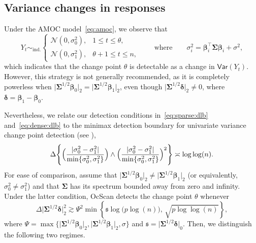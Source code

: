 \documentclass[11pt, a4paper]{article}
\newcommand{\mc}{\mathcal}
\renewcommand{\l}{\left}
\renewcommand{\r}{\right}
\newcommand{\cp}{\theta}
\newcommand{\Var}[0]{\mathsf{Var}}
\theoremstyle{definition}
\theoremstyle{definition}
\theoremstyle{definition}
\theoremstyle{definition}
\theoremstyle{definition}
\theoremstyle{remark}
\theoremstyle{definition}
\theoremstyle{definition}
\theoremstyle{definition}
\begin{document}
\subsection{Variance changes in responses}\label{ss:var}
Under the AMOC model~\eqref{eq:amoc}, we observe that
\[
Y_t \sim_{\mathrm{ind.}}
\begin{cases}
\mc N(0, \sigma_0^2), & 1 \le t \le \cp, \\
\mc N(0, \sigma_1^2), & \cp + 1 \le t \le n,
\end{cases}
\qquad \text{where} \qquad
\sigma_i^2 = \bm\beta_i^\top \bm\Sigma \bm\beta_i + \sigma^2,
\]
which indicates that the change point $\cp$ is detectable as a change in $\Var(Y_t)$. However, this strategy is not generally recommended, as it is completely powerless when
$\lvert \bm\Sigma^{1/2}\bm\beta_0\rvert_2 = \lvert \bm\Sigma^{1/2}\bm\beta_1\rvert_2$,
even though $\lvert \bm\Sigma^{1/2}\bm\delta\rvert_2 \neq 0$, where $\bm\delta = \bm\beta_1 - \bm\beta_0$.

Nevertheless, we relate our detection conditions in~\eqref{eq:sparse:dlb} and~\eqref{eq:dense:dlb} to the  minimax detection boundary for univariate variance change point detection (see \citealp[Theorem~1]{moen2024minimax}),
\begin{equation}\label{e:var:bnd}
\Delta \Biggl\{
\Bigl(\frac{\lvert \sigma_0^2 - \sigma_1^2\rvert}{\min\{\sigma_0^2, \sigma_1^2\}}\Bigr)
\wedge
\Bigl(\frac{\lvert \sigma_0^2 - \sigma_1^2\rvert}{\min\{\sigma_0^2, \sigma_1^2\}}\Bigr)^2
\Biggr\}
\asymp \log\log(n).
\end{equation}
For ease of comparison, assume that
$\lvert \bm\Sigma^{1/2}\bm\beta_0\rvert_2 \neq \lvert \bm\Sigma^{1/2}\bm\beta_1\rvert_2$
(or equivalently, $\sigma_0^2 \neq \sigma_1^2$) and that $\bm\Sigma$ has its spectrum bounded away from zero and infinity. Under the latter condition, OcScan detects the change point $\theta$ whenever
\begin{equation}\label{e:simple}
\Delta\lvert\bm\Sigma^{1/2}\bm\delta\rvert_2^2 \gtrsim \Psi^2\min\l\{\mathfrak{s}\log\bigl(p\log(n)\bigr),\,\sqrt{p \log\log(n)}\r\},
\end{equation}
where $\Psi = \max\{
\lvert \bm\Sigma^{1/2}\bm\beta_0\rvert_2,
\lvert \bm\Sigma^{1/2}\bm\beta_1\rvert_2,
\sigma
\}$ and $\mathfrak{s} = \lvert\bm\Sigma^{1/2}\bm\delta\rvert_0$.
Then, we distinguish the following two regimes.
\end{document}
